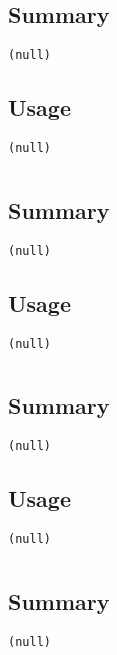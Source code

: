 \subsection{Summary}
\begin{verbatim}
(null)
\end{verbatim}
\subsection{Usage}
\begin{verbatim}
(null)
\end{verbatim}


\section{}
\subsection{Summary}
\begin{verbatim}
(null)
\end{verbatim}
\subsection{Usage}
\begin{verbatim}
(null)
\end{verbatim}


\section{}
\subsection{Summary}
\begin{verbatim}
(null)
\end{verbatim}
\subsection{Usage}
\begin{verbatim}
(null)
\end{verbatim}


\section{}
\subsection{Summary}
\begin{verbatim}
(null)
\end{verbatim}
